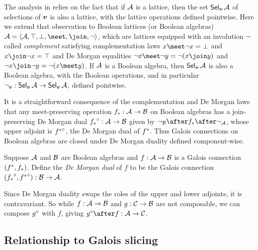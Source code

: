 The analysis in  relies on the fact that if $\mathcal{A}$ is a lattice, then the set $\textup{\textsf{Sel}}_{\bm{v}}\,{\mathcal{A}}$ of selections of $\bm{v}$ is also a lattice, with the lattice operations defined pointwise. Here we extend that observation to Boolean lattices (or Boolean algebras) $\Ann{A}= \BoolLattice{\Ann{A}}{\top}{\bot}{\meet}{\join}{\neg}$, which are lattices equipped with an involution $\neg$ called \emph{complement} satisfying complementation laws $x \meet \neg x = \bot$ and $x \join \neg x = \top$ and De Morgan equalities $\neg x \meet \neg y = \neg(x \join y)$ and $\neg x \join \neg y = \neg(x \meet y)$. If $\mathcal{A}$ is a Boolean algebra, then $\textup{\textsf{Sel}}_{\bm{v}}\,{\mathcal{A}}$ is also a Boolean algebra, with the Boolean operations, and in particular $\neg_{\bm{v}}: \textup{\textsf{Sel}}_{\bm{v}}\,{\mathcal{A}} \to \textup{\textsf{Sel}}_{\bm{v}}\,{\mathcal{A}}$, defined pointwise.



It is a straightforward consequence of the complementation and De Morgan laws that any meet-preserving operation ${f}_*: \mathcal{A} \to \mathcal{B}$ on Boolean algebras has a join-preserving De Morgan dual ${{f}_*}^{\circ}: \mathcal{A} \to \mathcal{B}$ given by $\neg_{\Ann{B}} \after \upperAdj{f} \after \neg_{\Ann{A}}$, whose upper adjoint is ${{f}^*}^{\circ}$, the De Morgan dual of ${f}^*$. Thus Galois connections on Boolean algebras are closed under De Morgan duality defined component-wise.

\begin{definition}
   Suppose $\mathcal{A}$ and $\mathcal{B}$ are Boolean algebras and $f: \mathcal{A} \to \mathcal{B}$ is a Galois connection $({f}^*,{f}_*)$. Define the \emph{De Morgan dual} of $f$ to be the Galois connection $({{f}_*}^{\circ}, {{f}^*}^{\circ}): \mathcal{B} \to \mathcal{A}$.
\end{definition}

\noindent Since De Morgan duality swaps the roles of the upper and lower adjoints, it is contravariant. So while $f: \mathcal{A} \to \mathcal{B}$ and $g: \mathcal{C} \to \mathcal{B}$ are not composable, we can compose ${g}^{\circ}$ with $f$, giving $\dual{g} \after f: \Ann{A} \to \Ann{C}$.



\subsection{Relationship to Galois slicing}

